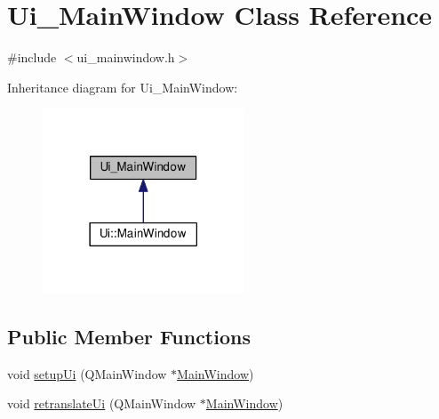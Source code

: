 \hypertarget{class_ui___main_window}{\section{Ui\-\_\-\-Main\-Window Class Reference}
\label{class_ui___main_window}
}


{\ttfamily \#include $<$ui\-\_\-mainwindow.\-h$>$}



Inheritance diagram for Ui\-\_\-\-Main\-Window\-:\nopagebreak
\begin{figure}[H]
\begin{center}
\leavevmode
\includegraphics[width=170pt]{class_ui___main_window__inherit__graph}
\end{center}
\end{figure}
\subsection*{Public Member Functions}
\begin{DoxyCompactItemize}
\item 
void \hyperlink{class_ui___main_window_acf4a0872c4c77d8f43a2ec66ed849b58}{setup\-Ui} (Q\-Main\-Window $\ast$\hyperlink{class_main_window}{Main\-Window})
\item 
void \hyperlink{class_ui___main_window_a097dd160c3534a204904cb374412c618}{retranslate\-Ui} (Q\-Main\-Window $\ast$\hyperlink{class_main_window}{Main\-Window})
\end{DoxyCompactItemize}
